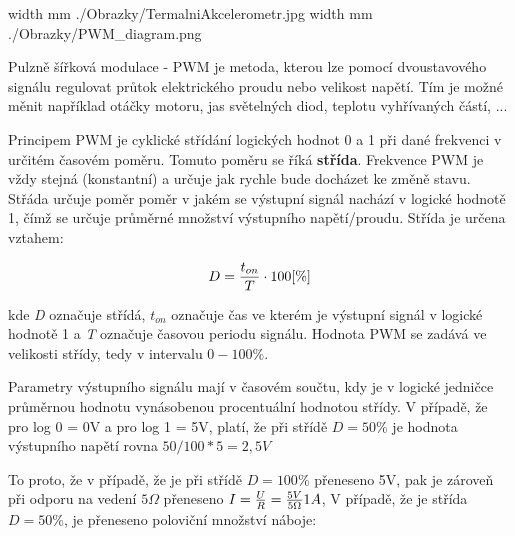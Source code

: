%
%
%



%


\pdfximage width \the\SirkaOdstavce mm {./Obrazky/TermalniAkcelerometr.jpg}
\pdfximage width \the\SirkaOdstavce mm {./Obrazky/PWM_diagram.png}


\Obsah



Pulzně šířková modulace - PWM je metoda, kterou lze pomocí dvoustavového signálu regulovat průtok elektrického proudu nebo velikost napětí. Tím je možné měnit například otáčky motoru, jas světelných diod, teplotu vyhřívaných částí, ...

Principem PWM je cyklické střídání logických hodnot 0 a 1 při dané frekvenci v určitém časovém poměru. Tomuto poměru se říká {\bf střída}. Frekvence PWM je vždy stejná (konstantní) a určuje jak rychle bude docházet ke změně stavu. Střáda určuje poměr poměr v jakém se výstupní signál nachází v logické hodnotě 1, čímž se určuje průměrné množství výstupního napětí/proudu. Střída je určena vztahem:

$$ D = {t_{on}\over T} \cdot 100[\%] $$

kde {\it D} označuje střídá, $t_{on}$ označuje čas ve kterém je výstupní signál v logické hodnotě 1 a {\it T} označuje časovou periodu signálu. Hodnota PWM se zadává ve velikosti střídy, tedy v intervalu $0 - 100\%$.

Parametry výstupního signálu mají v časovém součtu, kdy je v logické jedničce průměrnou hodnotu vynásobenou procentuální hodnotou střídy. V případě, že pro log 0 = 0V a pro log 1 = 5V, platí, že při střídě $D = 50\%$ je hodnota výstupního napětí rovna $50/100*5 = 2,5V$

To proto, že v případě, že je při střídě $D = 100\%$ přeneseno 5V, pak je zároveň při odporu na vedení $5\Omega$ přeneseno $I = {U\over R} = {5V\over 5\Omega} 1A $, V případě, že je střída $D=50\%$, je přeneseno poloviční množství náboje:

